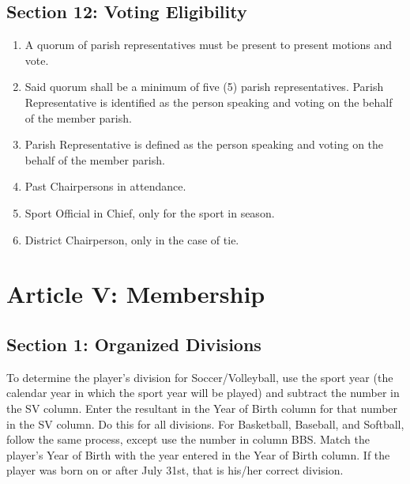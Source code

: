 \documentclass[letteraper,10pt,oneside,draft]{memoir}
\begin{document}
\subsection{Section 12: Voting Eligibility}
\label{ssec:const-4-12}
\begin{enumerate}[1.]
    \item A quorum of parish representatives must be present to present motions and vote.
    \item Said quorum shall be a minimum of five (5) parish representatives. Parish Representative is identified as the person speaking and voting on the behalf of the member parish.
    \item Parish Representative is defined as the person speaking and voting on the behalf of the member parish.
    \item Past Chairpersons in attendance.
    \item Sport Official in Chief, only for the sport in season.
    \item District Chairperson, only in the case of tie.
\end{enumerate}

\section{Article V: Membership}
\label{sec:const-5}
\subsection{Section 1: Organized Divisions}
\label{ssec:const-5-1}
To determine the player's division for Soccer/Volleyball, use the sport year (the calendar year in which the sport year will be played) and subtract the number in the SV column.  Enter the resultant in the Year of Birth column for that number in the SV column.   Do this for all divisions.  For Basketball, Baseball, and Softball, follow the same process, except use the number in column BBS.  Match the player's Year of Birth with the year entered in the Year of Birth column.  If the player was born on or after July 31st, that is his/her correct division.
\end{document}
